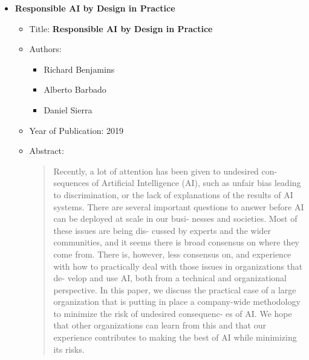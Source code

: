 \documentclass{article}
\begin{document}
    \begin{itemize}
    
        \item \textbf{Responsible AI by Design in Practice}
    
        \begin{itemize}
    
            \item Title: \textbf{Responsible AI by Design in Practice}
    
            \item Authors: 
    
            \begin{itemize}
    
                \item Richard Benjamins
    
                \item Alberto Barbado
    
                \item Daniel Sierra
    
            \end{itemize}
    
            \item Year of Publication: 2019
    
            \item Abstract:
    
            \begin{abstract}
    
                Recently, a lot of attention has been given to undesired con-
                sequences of Artificial Intelligence (AI), such as unfair bias 
                leading to discrimination, or the lack of explanations of the 
                results of AI systems. There are several important questions 
                to  answer  before  AI  can  be  deployed  at  scale  in  our  busi-
                nesses  and  societies.  Most  of  these  issues  are  being  dis-
                cussed  by  experts  and the  wider communities,  and  it  seems 
                there is broad consensus on where they come from. There is, 
                however,  less  consensus  on,  and  experience  with  how  to 
                practically  deal  with  those  issues  in  organizations  that  de-
                velop  and  use  AI,  both  from  a  technical  and  organizational 
                perspective. In this paper, we discuss the practical case of a 
                large  organization  that  is  putting  in  place  a  company-wide 
                methodology to minimize the risk of undesired consequenc-
                es  of  AI.  We  hope  that  other  organizations  can  learn  from 
                this  and  that  our  experience  contributes  to  making  the  best 
                of AI while minimizing its risks.
           

\end{abstract}
\end{itemize}
\end{itemize}
\end{document}
